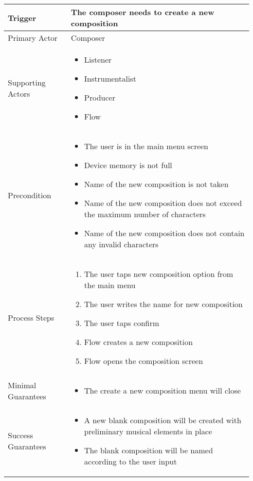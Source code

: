 \begin{longtable}{|X|X|}

\hline
Trigger & 
The composer needs to create a new composition \\
\hline
Primary Actor & 
Composer \\
\hline
Supporting Actors & 
\begin{itemize}
\item Listener
\item Instrumentalist
\item Producer
\item Flow
\end{itemize} \\
\hline
Precondition & 
\begin{itemize}
\item The user is in the main menu screen
\item Device memory is not full
\item Name of the new composition is not taken
\item Name of the new composition does not exceed the maximum number of characters
\item Name of the new composition does not contain any invalid characters
\end{itemize} \\
\hline
Process Steps & 
\begin{enumerate}
\item The user taps new composition option from the main menu
\item The user writes the name for new composition
\item The user taps confirm
\item Flow creates a new composition
\item Flow opens the composition screen
\end{enumerate} \\
\hline
Minimal Guarantees & 
\begin{itemize}
	\item The create a new composition menu will close
\end{itemize} \\
\hline
Success Guarantees & 
\begin{itemize}
	\item A new blank composition will be created with preliminary musical elements in place
	\item The blank composition will be named according to the user input
\end{itemize} \\
\hline
\end{longtable}
